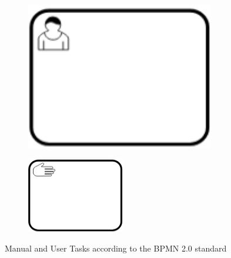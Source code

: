 \begin{figure}[h]
	\centering
	\begin{subfigure}[b]{0.18\columnwidth}
		\centering
		\includegraphics[width=0.9\textwidth]{graphics/user-task}
		\label{fig:usertask}
	\end{subfigure}
	\begin{subfigure}[b]{0.18\columnwidth}
		\centering
		\includegraphics[width=0.9\columnwidth]{graphics/manual-task}
		\label{fig:manualtask}
	\end{subfigure}
	\caption{Manual and User Tasks according to the BPMN 2.0 standard \cite{bpmnstandard}} %
	\label{fig:nonautomatedtasks} %
\end{figure}
